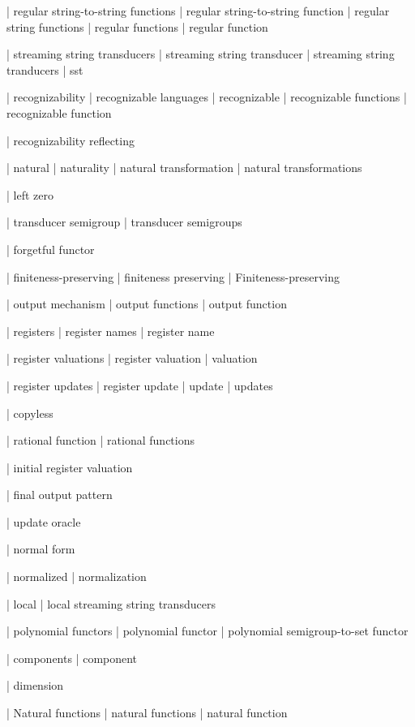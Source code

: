  | regular string-to-string functions
 | regular string-to-string function
 | regular string functions
 | regular functions
 | regular function

| streaming string transducers
 | streaming string transducer
| streaming string tranducers
| sst

| recognizability
| recognizable languages
| recognizable
| recognizable functions
| recognizable function

| recognizability reflecting

| natural
| naturality
| natural transformation
| natural transformations

| left zero

| transducer semigroup
| transducer semigroups

| forgetful functor

| finiteness-preserving
| finiteness preserving
| Finiteness-preserving

| output mechanism
| output functions
| output function

| registers
| register names
| register name

| register valuations
| register valuation
| valuation

| register updates
| register update
| update
| updates

| copyless

| rational function
| rational functions

| initial register valuation

| final output pattern

| update oracle

| normal form

| normalized
| normalization

| local
| local streaming string transducers

| polynomial functors
| polynomial functor
| polynomial semigroup-to-set functor

| components
| component

| dimension

| Natural functions
| natural functions
| natural function

